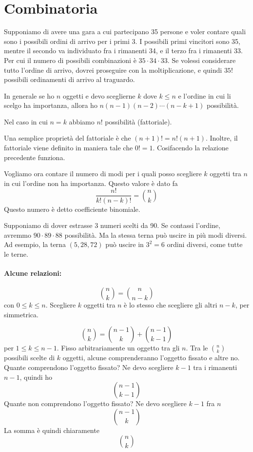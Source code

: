 \documentclass[a4paper]{article}
\begin{document}
\pagebreak

\section{Combinatoria}

Supponiamo di avere una gara a cui partecipano 35 persone e voler contare quali sono i possibili ordini di
arrivo per i primi 3. I possibili primi vincitori sono 35, mentre il secondo va individuato fra i rimanenti
34, e il terzo fra i rimanenti 33. Per cui il numero di possibili combinazioni è \(35\cdot 34 \cdot 33\).
Se volessi considerare tutto l'ordine di arrivo, dovrei proseguire con la moltiplicazione, e quindi
\(35!\) possibili ordinamenti di arrivo al traguardo.

In generale se ho \(n\) oggetti e devo sceglierne \(k\) dove \(k\leq n\)
e l'ordine in cui li scelgo ha importanza, allora ho \(n(n-1)(n-2)\cdots (n-k+1)\) possibilità.

Nel caso in cui \(n=k\) abbiamo \(n!\) possibilità (fattoriale).

Una semplice proprietà del fattoriale è che \((n+1)! = n!(n+1)\).
Inoltre, il fattoriale viene definito in maniera tale che \(0!=1\).
Cosifacendo la relazione precedente funziona.

Vogliamo ora contare il numero di modi per i quali posso scegliere \(k\) oggetti tra \(n\)
in cui l'ordine non ha importanza. Questo valore è dato fa
\[
    \frac{n!}{k!(n-k)!} = \binom{n}{k}
\]
Questo numero è detto coefficiente binomiale.

Supponiamo di dover estrasse 3 numeri scelti da 90. Se contassi l'ordine, avremmo \(90\cdot 89 \cdot 88\)
possibilità. Ma la stessa terna può uscire in più modi diversi. Ad esempio, la terna \((5,28,72)\)
può uscire in \(3^2 = 6\) ordini diversi, come tutte le terne.

\paragraph{Alcune relazioni:}
\[
    \binom{n}{k} = \binom{n}{n-k}
\]
con \(0\leq k \leq n\).
Scegliere \(k\) oggetti tra \(n\) è lo stesso che scegliere gli altri \(n-k\), per simmetrica.

\[
    \binom{n}{k} = \binom{n-1}{k} + \binom{n-1}{k-1}
\]
per \(1 \leq k \leq n-1\).
Fisso arbitrariamente un oggetto tra gli \(n\).
Tra le \(\binom{n}{k}\) possibili scelte di \(k\) oggetti, alcune
comprenderanno l'oggetto fissato e altre no.
Quante comprendono l'oggetto fissato? Ne devo scegliere
\(k-1\) tra i rimanenti \(n-1\), quindi ho
\[
    \binom{n-1}{k-1}
\]
Quante non comprendono l'oggetto fissato?
Ne devo scegliere \(k-1\) fra \(n\)
\[
    \binom{n-1}{k}
\]
La somma è quindi chiaramente
\[
    \binom{n}{k}
\]
\end{document}
